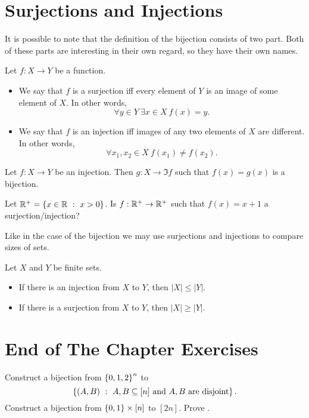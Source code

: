 \section{Surjections and Injections}

It is possible to note that the definition of the bijection consists of two part.
Both of these parts are interesting in their own regard, so they have their own
names.
\begin{definition}
  Let $f : X \to Y$ be a function.
  \begin{itemize}
    \item We say that $f$ is a surjection iff every element of $Y$ is an image
      of some element of $X$. In other words,
      $$
          \forall y \in Y~\exists x \in X\ f(x) = y.
      $$
    \item We say that $f$ is an injection iff images of any two elements
      of $X$ are different. In other words,
      $$
          \forall x_1, x_2 \in X\ f(x_1) \neq f(x_2).
      $$
  \end{itemize}
\end{definition}

\begin{remark}
  Let $f : X \to Y$ be an injection. Then $g : X \to \Im f$ such that
  $f(x) = g(x)$ is a bijection.
\end{remark}

\begin{exercise}
  Let $\R^+ = \set[x > 0]{x \in \R}$. Is $f : \mathbb{R}^+ \to \mathbb{R}^+$ such that
  $f(x) = x + 1$ a surjection/injection?
\end{exercise}

Like in the case of the bijection we may use surjections and injections to
compare sizes of sets.
\begin{theorem}
\label{theorem:injections-surjections-inequalities}
  Let $X$ and $Y$ be finite sets.
  \begin{itemize}
    \item If there is an injection from $X$ to $Y$, then $|X| \le |Y|$.
    \item If there is a surjection from $X$ to $Y$, then $|X| \ge |Y|$.
  \end{itemize}
\end{theorem}

\section*{End of The Chapter Exercises}
\begin{exercises}
  \exerciseitem Construct a bijection from $\set{0, 1, 2}^n$ to
    $$\set[{A, B \subseteq [n] \text{ and } A, B \text{ are
    disjoint}}]{(A, B)}.$$
  \exerciseitem Construct a bijection from $\set{0, 1} \times [n]$ to $[2n]$.
  \exerciseitem Prove .
\end{exercises}
